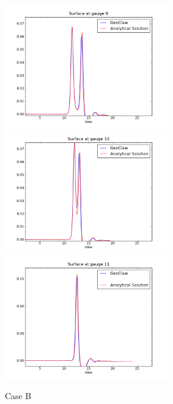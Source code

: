 \begin{figure}[ht]
\hfil\includegraphics[width=2.8in]{bp2/CaseB/gauge0009fig300.png}\hfil
\vskip 5pt
\hfil\includegraphics[width=2.8in]{bp2/CaseB/gauge0010fig300.png}\hfil
\hfil\includegraphics[width=2.8in]{bp2/CaseB/gauge0011fig300.png}\hfil
\caption{\label{fig:bp2B} Case B }
\end{figure}


